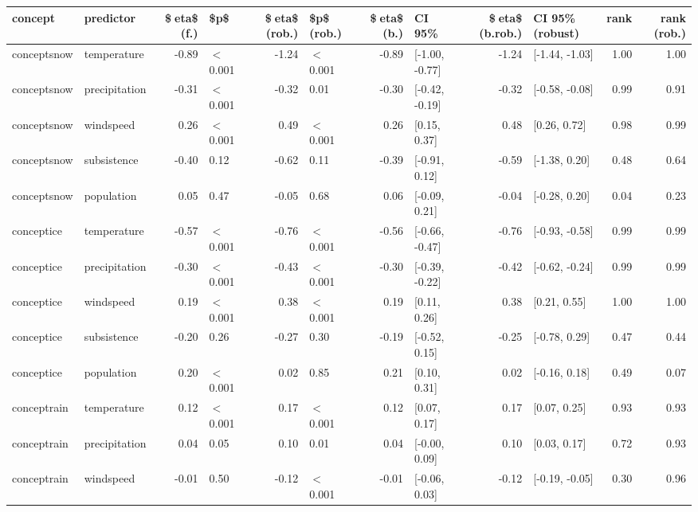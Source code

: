 \begin{table}[ht]
\centering
\begin{tabular}{llrlrlrlrlrr}
  \hline
concept & predictor & \$eta\$ (f.) & \$p\$ & \$eta\$ (rob.) & \$p\$ (rob.) & \$eta\$ (b.) & CI 95\% & \$eta\$ (b.rob.) & CI 95\% (robust) & rank & rank (rob.) \\ 
  \hline
conceptsnow & temperature & -0.89 & $<$ 0.001 & -1.24 & $<$ 0.001 & -0.89 & [-1.00, -0.77] & -1.24 & [-1.44, -1.03] & 1.00 & 1.00 \\ 
  conceptsnow & precipitation & -0.31 & $<$ 0.001 & -0.32 & 0.01 & -0.30 & [-0.42, -0.19] & -0.32 & [-0.58, -0.08] & 0.99 & 0.91 \\ 
  conceptsnow & windspeed & 0.26 & $<$ 0.001 & 0.49 & $<$ 0.001 & 0.26 & [0.15, 0.37] & 0.48 & [0.26, 0.72] & 0.98 & 0.99 \\ 
  conceptsnow & subsistence & -0.40 & 0.12 & -0.62 & 0.11 & -0.39 & [-0.91, 0.12] & -0.59 & [-1.38, 0.20] & 0.48 & 0.64 \\ 
  conceptsnow & population & 0.05 & 0.47 & -0.05 & 0.68 & 0.06 & [-0.09, 0.21] & -0.04 & [-0.28, 0.20] & 0.04 & 0.23 \\ 
  conceptice & temperature & -0.57 & $<$ 0.001 & -0.76 & $<$ 0.001 & -0.56 & [-0.66, -0.47] & -0.76 & [-0.93, -0.58] & 0.99 & 0.99 \\ 
  conceptice & precipitation & -0.30 & $<$ 0.001 & -0.43 & $<$ 0.001 & -0.30 & [-0.39, -0.22] & -0.42 & [-0.62, -0.24] & 0.99 & 0.99 \\ 
  conceptice & windspeed & 0.19 & $<$ 0.001 & 0.38 & $<$ 0.001 & 0.19 & [0.11, 0.26] & 0.38 & [0.21, 0.55] & 1.00 & 1.00 \\ 
  conceptice & subsistence & -0.20 & 0.26 & -0.27 & 0.30 & -0.19 & [-0.52, 0.15] & -0.25 & [-0.78, 0.29] & 0.47 & 0.44 \\ 
  conceptice & population & 0.20 & $<$ 0.001 & 0.02 & 0.85 & 0.21 & [0.10, 0.31] & 0.02 & [-0.16, 0.18] & 0.49 & 0.07 \\ 
  conceptrain & temperature & 0.12 & $<$ 0.001 & 0.17 & $<$ 0.001 & 0.12 & [0.07, 0.17] & 0.17 & [0.07, 0.25] & 0.93 & 0.93 \\ 
  conceptrain & precipitation & 0.04 & 0.05 & 0.10 & 0.01 & 0.04 & [-0.00, 0.09] & 0.10 & [0.03, 0.17] & 0.72 & 0.93 \\ 
  conceptrain & windspeed & -0.01 & 0.50 & -0.12 & $<$ 0.001 & -0.01 & [-0.06, 0.03] & -0.12 & [-0.19, -0.05] & 0.30 & 0.96 \\ 

\end{tabular}
\end{table}

